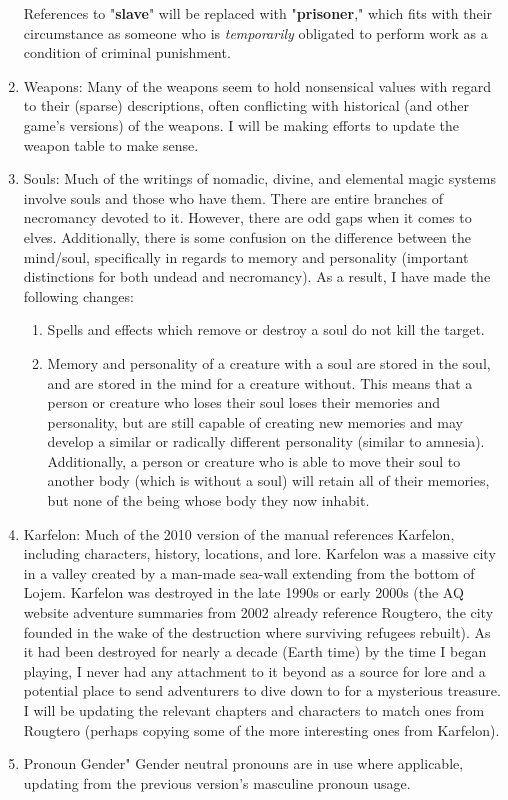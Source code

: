 \begin{enumerate}[leftmargin=12pt]
References to "\textbf{slave}" will be replaced with "\textbf{prisoner}," which fits with their circumstance as someone who is \textit{temporarily} obligated to perform work as a condition of criminal punishment. 
\item Weapons: Many of the weapons seem to hold nonsensical values with regard to their (sparse) descriptions, often conflicting with historical (and other game's versions) of the weapons. I will be making efforts to update the weapon table to make sense.
\item Souls: Much of the writings of nomadic, divine, and elemental magic systems involve souls and those who have them. There are entire branches of necromancy devoted to it. However, there are odd gaps when it comes to elves. Additionally, there is some confusion on the difference between the mind/soul, specifically in regards to memory and personality (important distinctions for both undead and necromancy). As a result, I have made the following changes:
\begin{enumerate}
	\item Spells and effects which remove or destroy a soul do not kill the target.
	\item Memory and personality of a creature with a soul are stored in the soul, and are stored in the mind for a creature without. This means that a person or creature who loses their soul loses their memories and personality, but are still capable of creating new memories and may develop a similar or radically different personality (similar to amnesia). Additionally, a person or creature who is able to move their soul to another body (which is without a soul) will retain all of their memories, but none of the being whose body they now inhabit.
\end{enumerate}
\item Karfelon: Much of the 2010 version of the manual references Karfelon, including characters, history, locations, and lore. Karfelon was a massive city in a valley created by a man-made sea-wall extending from the bottom of Lojem. Karfelon was destroyed in the late 1990s or early 2000s (the AQ website adventure summaries from 2002 already reference Rougtero, the city founded in the wake of the destruction where surviving refugees rebuilt). As it had been destroyed for nearly a decade (Earth time) by the time I began playing, I never had any attachment to it beyond as a source for lore and a potential place to send adventurers to dive down to for a mysterious treasure. I will be updating the relevant chapters and characters to match ones from Rougtero (perhaps copying some of the more interesting ones from Karfelon).
\item Pronoun Gender" Gender neutral pronouns are in use where applicable, updating from the previous version's masculine pronoun usage.
\end{enumerate}
